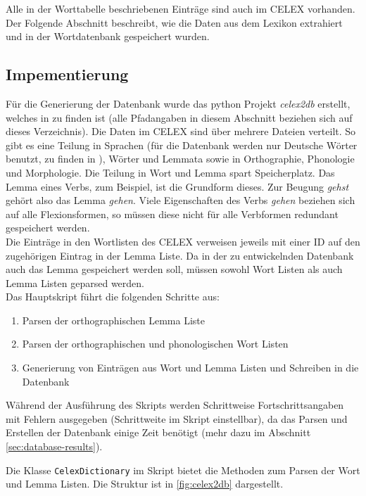 Alle in der Worttabelle beschriebenen Einträge sind auch im CELEX vorhanden. Der Folgende Abschnitt beschreibt, wie die Daten aus dem Lexikon extrahiert und in der Wortdatenbank gespeichert wurden.

\subsection{Impementierung}

Für die Generierung der Datenbank wurde das python Projekt \textit{celex2db} erstellt, welches in  zu finden ist (alle Pfadangaben in diesem Abschnitt beziehen sich auf dieses Verzeichnis). Die Daten im CELEX  sind über mehrere Dateien verteilt. So gibt es eine Teilung in Sprachen (für die Datenbank werden nur Deutsche Wörter benutzt, zu finden in ), Wörter und Lemmata sowie in Orthographie, Phonologie und Morphologie. Die Teilung in Wort und Lemma spart Speicherplatz. Das Lemma eines Verbs, zum Beispiel, ist die Grundform dieses. Zur Beugung \textit{gehst} gehört also das Lemma \textit{gehen}. Viele Eigenschaften des Verbs \textit{gehen} beziehen sich auf alle Flexionsformen, so müssen diese nicht für alle Verbformen redundant gespeichert werden.\\
Die Einträge in den Wortlisten des CELEX verweisen jeweils mit einer ID auf den zugehörigen Eintrag in der Lemma Liste. Da in der zu entwickelnden Datenbank auch das Lemma gespeichert werden soll, müssen sowohl Wort Listen als auch Lemma Listen geparsed werden.\\

Das Hauptskript  führt die folgenden Schritte aus:
\begin{enumerate}
	\item Parsen der orthographischen Lemma Liste
	\item Parsen der orthographischen und phonologischen Wort Listen
	\item Generierung von Einträgen aus Wort und Lemma Listen und Schreiben in die Datenbank
\end{enumerate}
Während der Ausführung des Skripts werden Schrittweise Fortschrittsangaben mit Fehlern ausgegeben (Schrittweite im Skript einstellbar), da das Parsen und Erstellen der Datenbank einige Zeit benötigt (mehr dazu im Abschnitt \ref{sec:database-results}).

Die Klasse \texttt{CelexDictionary} im Skript  bietet die Methoden zum Parsen der Wort und Lemma Listen. Die Struktur ist in \ref{fig:celex2db} dargestellt.\\

